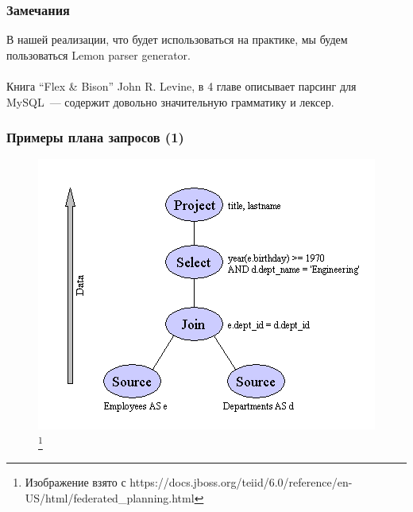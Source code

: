 \documentclass{beamer}
\begin{document}
\begin{frame}

\frametitle{Замечания}

В нашей реализации, что будет использоваться на практике, мы будем пользоваться Lemon parser generator.\\~\\

Книга ``Flex \& Bison'' John R. Levine, в 4 главе описывает парсинг для MySQL~--- содержит довольно значительную грамматику и лексер.



\end{frame}

\begin{frame}
\frametitle{Примеры плана запросов (1)}

\begin{figure}[htb]
\includegraphics[width=\textwidth,height=0.75\textheight,keepaspectratio]{query-plan1.png} \footnote{\tiny{Изображение взято с https://docs.jboss.org/teiid/6.0/reference/en-US/html/federated\_planning.html}}
\end{figure}
\end{frame}
\end{document}
